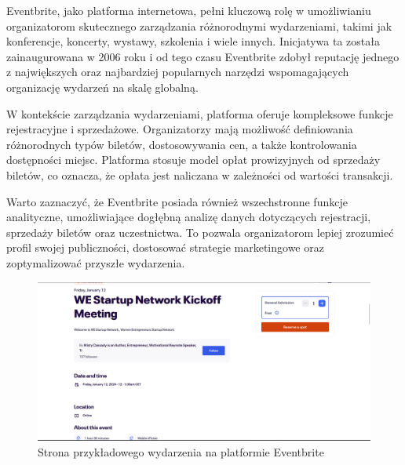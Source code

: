 Eventbrite, jako platforma internetowa, pełni kluczową rolę w umożliwianiu organizatorom skutecznego zarządzania różnorodnymi wydarzeniami, takimi jak konferencje, koncerty, wystawy, szkolenia i wiele innych. Inicjatywa ta została zainaugurowana w 2006 roku i od tego czasu Eventbrite zdobył reputację jednego z największych oraz najbardziej popularnych narzędzi wspomagających organizację wydarzeń na skalę globalną. \autocite{eventbrite}

W kontekście zarządzania wydarzeniami, platforma oferuje kompleksowe funkcje rejestracyjne i sprzedażowe. Organizatorzy mają możliwość definiowania różnorodnych typów biletów, dostosowywania cen, a także kontrolowania dostępności miejsc. Platforma stosuje model opłat prowizyjnych od sprzedaży biletów, co oznacza, że opłata jest naliczana w zależności od wartości transakcji. 

Warto zaznaczyć, że Eventbrite posiada również wszechstronne funkcje analityczne, umożliwiające dogłębną analizę danych dotyczących rejestracji, sprzedaży biletów oraz uczestnictwa. To pozwala organizatorom lepiej zrozumieć profil swojej publiczności, dostosować strategie marketingowe oraz zoptymalizować przyszłe wydarzenia.

\begin{figure}
    \begin{center}
    \includegraphics[scale=0.35]{imgs/solutions/eventbrite.png}
    \end{center}
    \caption{Strona przykładowego wydarzenia na platformie Eventbrite}
    \label{rys:ev_interfejs}
    \end{figure}